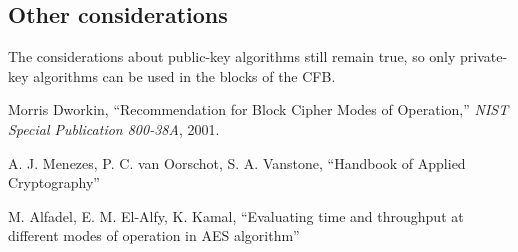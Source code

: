 \documentclass[11 pt]{article}
\begin{document}
\subsection{Other considerations}
The considerations about public-key algorithms still remain true, so only private-key algorithms can be used in the blocks of the CFB.

\begin{thebibliography}{10}

	Morris Dworkin, ``Recommendation for Block Cipher Modes of Operation,'' {\em NIST Special Publication 800-38A},
	2001.
	
	A. J. Menezes, P. C. van Oorschot, S. A. Vanstone, ``Handbook of Applied Cryptography''
	
	M. Alfadel, E. M. El-Alfy, K. Kamal, ``Evaluating time and throughput at different modes of operation in AES algorithm''
	
	
\end{thebibliography}
\end{document}
